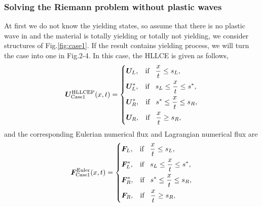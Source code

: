 \documentclass{article}
\theoremstyle{plain}\newtheorem{definition}{\sc{Definition}}
\theoremstyle{defination}\newtheorem{example}{Example}[section]
\numberwithin{equation}{section}
\numberwithin{table}{section}
\begin{document}
\subsubsection{Solving the Riemann problem without  plastic waves}\label{sec:case1}
At first we do not know the yielding states, so assume that there is no plastic wave in  and the material is totally yielding or totally not yielding, we consider structures of Fig.\ref{fig:case1}. If the result contains yielding process, we will turn the case into one in Fig.2-4.
%
In this case, the HLLCE is given as follows,
\begin{equation}\label{eq:HLLCEP}
  \bm{U}^{\text{HLLCEP}}_{\text{Case1}}(x,t) = \left\{ \begin{aligned}
		& \bm{U}_L, \hspace{0.3cm} \text{if} \hspace{0.3cm} \frac{x}{t}\le s_L, \\
		& \bm{U}_L^*, \hspace{0.3cm} \text{if} \hspace{0.3cm} s_L\le \frac{x}{t} \le s^*, \\
		& \bm{U}_R^*, \hspace{0.3cm} \text{if} \hspace{0.3cm} s^*\le \frac{x}{t} \le s_R,\\
		& \bm{U}_R, \hspace{0.3cm} \text{if} \hspace{0.3cm} \frac{x}{t}\ge s_R, \\
	  \end{aligned}
	\right.
  \end{equation}
  and the corresponding Eulerian numerical flux and Lagrangian numerical flux are 
 \begin{equation}
	\bm{F}^{\text{Euler}}_{\text{Case1}}(x,t) = \left\{ \begin{aligned}
		& \bm{F}_L, \hspace{0.3cm} \text{if} \hspace{0.3cm} \frac{x}{t}\le s_L, \\
		& \bm{F}_L^*, \hspace{0.3cm} \text{if} \hspace{0.3cm} s_L\le \frac{x}{t} \le s^*, \\
		& \bm{F}_R^*, \hspace{0.3cm} \text{if} \hspace{0.3cm} s^*\le \frac{x}{t} \le s_R,\\
		& \bm{F}_R, \hspace{0.3cm} \text{if} \hspace{0.3cm} \frac{x}{t}\ge s_R, \\
	  \end{aligned}
	\right.
  \end{equation}
\end{document}
